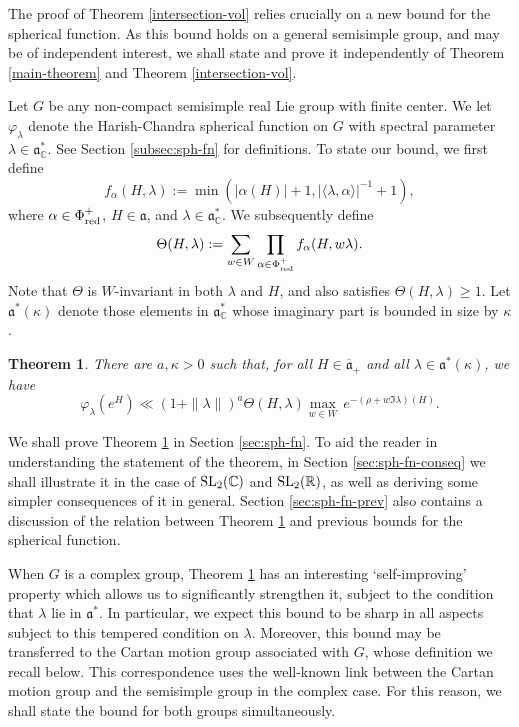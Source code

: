 \documentclass[12pt]{amsart}
\newtheorem{theorem}{Theorem}[section]
\theoremstyle{remark}
\newcommand{\C}{\mathbb C}
\newcommand{\ga}{\mathfrak a}
\begin{document}
The proof of Theorem \ref{intersection-vol} relies crucially on a new bound for the spherical function.  As this bound holds on a general semisimple group, and may be of independent interest, we shall state and prove it independently of Theorem \ref{main-theorem} and Theorem \ref{intersection-vol}.

Let $G$ be any non-compact semisimple real Lie group with finite center. We let $\varphi_\lambda$ denote the Harish-Chandra spherical function on $G$ with spectral parameter $\lambda \in \ga^*_\C$. See Section \ref{subsec:sph-fn} for definitions. To state our bound, we first define
\begin{equation}\label{defn-falpha}
    f_{\alpha}(H, \lambda) := \min(|\alpha(H)|+1, |\langle \lambda, \alpha \rangle|^{-1} + 1),
\end{equation}
where $\alpha \in \Phi^+_{\textnormal{red}}$, $H \in \mathfrak{a}$, and $\lambda \in \mathfrak{a}^*_{\mathbb{C}}$. We subsequently define
\begin{gather}
\label{Thetadef}
    \Theta(H, \lambda) := \sum_{w \in W} \prod_{\alpha \in \Phi^+_{\textnormal{red}}} f_{\alpha}(H, w\lambda).
\end{gather}
Note that $\Theta$ is $W$-invariant in both $\lambda$ and $H$, and also satisfies $\Theta(H, \lambda) \geq 1$. Let $\mathfrak{a}^*(\kappa)$ denote those elements in $\mathfrak{a}^*_{\mathbb{C}}$ whose imaginary part is bounded in size by $\kappa$.

\begin{theorem}
\label{sph-fn-bd}
There are $a, \kappa > 0$ such that, for all $H \in \overline{\ga}_+$ and all $\lambda \in \ga^*(\kappa)$, we have
\[
\varphi_\lambda(e^H) \ll (1 + \| \lambda \|)^a \Theta(H, \lambda) \underset{w \in W}{\max} \, e^{-(\rho + w \Im \lambda)(H) }.
\]
\end{theorem}

We shall prove Theorem \ref{sph-fn-bd} in Section \ref{sec:sph-fn}.  To aid the reader in understanding the statement of the theorem, in Section \ref{sec:sph-fn-conseq} we shall illustrate it in the case of ${\rm SL}_2(\C)$ and $\textnormal{SL}_2( \mathbb{R})$, as well as deriving some simpler consequences of it in general.  Section \ref{sec:sph-fn-prev} also contains a discussion of the relation between Theorem \ref{sph-fn-bd} and previous bounds for the spherical function.

When $G$ is a complex group, Theorem \ref{sph-fn-bd} has an interesting `self-improving' property which allows us to significantly strengthen it, subject to the condition that $\lambda$ lie in $\ga^*$.  In particular, we expect this bound to be sharp in all aspects subject to this tempered condition on $\lambda$.  Moreover, this bound may be transferred to the Cartan motion group associated with $G$, whose definition we recall below. This correspondence uses the well-known link between the Cartan motion group and the semisimple group in the complex case. For this reason, we shall state the bound for both groups simultaneously.
\end{document}
